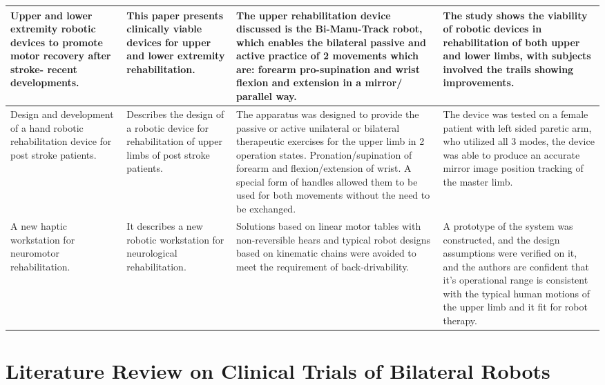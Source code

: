 \begin{longtable}{|p{4cm}|p{3.8cm}|p{7cm}|p{4cm}|}
	\hline
	Upper and lower extremity robotic devices to promote motor recovery after stroke- recent developments. \cite{Schmidt2004}&This paper presents clinically viable devices for upper and lower extremity rehabilitation.&The upper rehabilitation device discussed is the Bi-Manu-Track robot, which enables the bilateral passive and active practice of 2 movements which are: forearm pro-supination and wrist flexion and extension in a mirror/ parallel way. &The study shows the viability of robotic devices in rehabilitation of both upper and lower limbs, with subjects involved the trails showing improvements.\\
	\hline
	Design and development of a hand robotic rehabilitation device for post stroke patients. \cite{Rashedi2009}&Describes the design of a robotic device for rehabilitation of upper limbs of post stroke patients.&The apparatus was designed to provide the passive or active unilateral or bilateral therapeutic exercises for the upper limb in 2 operation states. Pronation/supination of forearm and flexion/extension of wrist. A special form of handles allowed them to be used for both movements without the need to be exchanged.&The device was tested on a female patient with left sided paretic arm, who utilized all 3 modes, the device was able to produce an accurate mirror image position tracking of the master limb.\\
	\hline
	A new haptic workstation for neuromotor rehabilitation. \cite{Casadio2006}&It describes a new robotic workstation for neurological rehabilitation.&Solutions based on linear motor tables with non-reversible hears and typical robot designs based on kinematic chains were avoided to meet the requirement of back-drivability. &A prototype of the system was constructed, and the design assumptions were verified on it, and the authors are confident that it’s operational range is consistent with the typical human motions of the upper limb and it fit for robot therapy.\\
	\hline
\end{longtable}

\endgroup
\restoregeometry
{}
\section{Literature Review on Clinical Trials of Bilateral Robots}\label{sec:clinical}


\begingroup
\linespread{0.9}\sffamily\footnotesize

